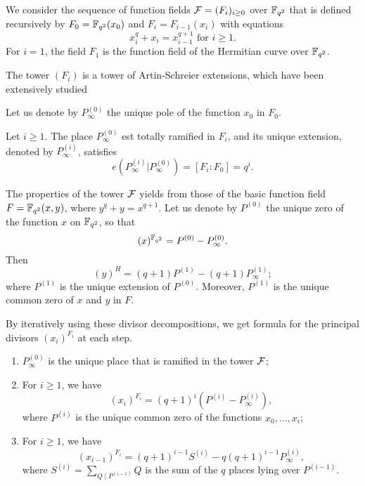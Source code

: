\documentclass[10pt]{article}
\begin{document}
We consider the sequence of function fields $\mathcal{F}=(F_i)_{i\geq 0}$ over $\mathbb{F}_{q^2}$ that is defined recursively by $F_0=\mathbb{F}_{q^2}(x_0)$ and $F_i = F_{i-1}(x_i)$ with equations
\[x_i^q+x_{i} = x_{i-1}^{q+1} \text{ for } i\geq 1.\]
For $i=1$, the field $F_1$ is the function field of the Hermitian curve over $\mathbb{F}_{q^2}$.

The tower $(F_i)$ is a tower of Artin-Schreier extensions, which have been extensively studied  

Let us denote by $P_{\infty}^{(0)}$ the unique pole of the function $x_0$ in $F_0$.

\begin{lemma}\cite[Proposition 3.7.8]{S08}
	Let $i \geq 1$. The place $P_{\infty}^{(0)}$ est totally ramified in $F_i$, and its unique extension, denoted by $P_{\infty}^{(i)}$, satisfies
\[e\left(P_{\infty}^{(i)}|P_{\infty}^{(0)}\right) = [F_i:F_0]=q^i.\]
\end{lemma}


The properties of the tower $\mathcal{F}$ yields from those of the basic function field $F=\mathbb{F}_{q^2}(x,y)$, where $y^q+y=x^{q+1}$. Let us denote by $P^{(0)}$ the unique zero of the function $x$ on $\mathbb{F}_{q^2}$, so that
\[(x)^{\mathbb{F}_{q^2}} = P^{(0)} - P^{(0)}_{\infty}.\]
Then
\[(y)^H = (q+1)P^{(1)} - (q+1)P^{(1)}_{\infty};\]
where $P^{(1)}$ is the unique extension of $P^{(0)}$. Moreover, $P^{(1)}$ is the unique common zero of $x$ and $y$ in $F$.

By iteratively using these divisor decompositions, we get formula for the principal divisors $(x_i)^{F_i}$ at each step.
\begin{lemma} \label{div princ}
\begin{enumerate}
\item $P_{\infty}^{(0)}$ is the unique place that is ramified in the tower $\mathcal{F}$;
\item For $i \geq 1$, we have 
\[(x_i)^{F_i} = (q+1)^i \left(P^{(i)} - P_{\infty}^{(i)}\right),\]
where $P^{(i)}$ is the unique common zero of the functions $x_0,...,x_i$;
\item For $i \geq 1$, we have 
\[(x_{i-1})^{F_i} = (q+1)^{i-1}S^{(i)} - q(q+1)^{i-1}P_{\infty}^{(i)},\]
where $ S^{(i)} = \sum_{Q\mid P^{(i-1)}} Q$ is the sum of the $q$ places lying over $P^{(i-1)}$.
\end{enumerate}
\end{lemma}
\end{document}
